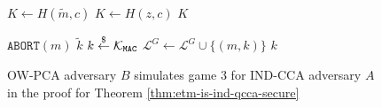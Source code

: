 \documentclass[letterpaper,12pt,titlepage,oneside,final]{book}
\newcommand{\mac}{\texttt{\texttt{MAC}}}
\newcommand{\pco}{\texttt{PCO}}
\newcommand{\leftsample}{\stackrel{\$}{\leftarrow}}
\begin{document}
\begin{figure}[htbp]
\begin{minipage}[t]{0.49\textwidth}
\begin{algorithm}[H]
\begin{algorithmic}[1]
                    \State $K \leftarrow H(\tilde{m}, c)$
                \Else
                    \State $K \leftarrow H(z, c)$
                \EndIf
                \State \Return $K$
            \end{algorithmic}
        \end{algorithm}\vspace{-0em}
        \begin{algorithm}[H]
            \caption*{$\mathcal{O}^G_B(m)$}
            \begin{algorithmic}[1]
                \If{$\mathcal{O}^\pco(m, {c^\prime}^\ast) = 1$}
                    \State $\texttt{ABORT}(m)$
                \EndIf
                    \State \Return $\tilde{k}$
                \EndIf
                \State $k \leftsample \mathcal{K}_\mac$
                \State $\mathcal{L}^G \leftarrow \mathcal{L}^G \cup \{(m, k)\}$
                \State \Return $k$
            \end{algorithmic}
        \end{algorithm}
    \end{minipage}
    \caption{OW-PCA adversary $B$ simulates game 3 for IND-CCA adversary $A$ in the proof for Theorem \ref{thm:etm-is-ind-qcca-secure}}\label{fig:ow-pca-simulates-game-3}
\end{figure}
\end{document}
